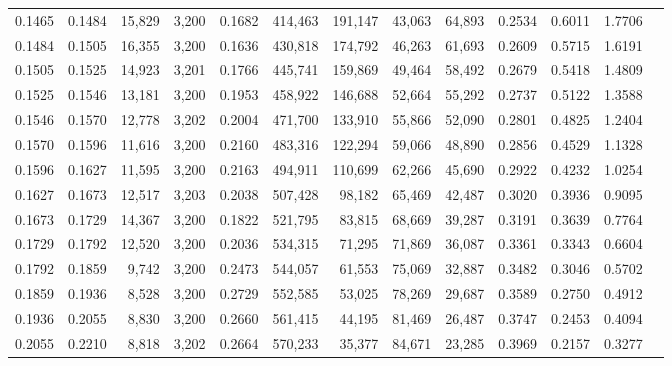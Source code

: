 \begin{tabular}{rrrrrrrrrrrrr}
0.1465 & 0.1484 & 15,829 & 3,200 &                                     0.1682 & 414,463 & 191,147 &  43,063 &  64,893 & 0.2534 & 0.6011 & 1.7706 \\
0.1484 & 0.1505 & 16,355 & 3,200 &                                     0.1636 & 430,818 & 174,792 &  46,263 &  61,693 & 0.2609 & 0.5715 & 1.6191 \\
0.1505 & 0.1525 & 14,923 & 3,201 &                                     0.1766 & 445,741 & 159,869 &  49,464 &  58,492 & 0.2679 & 0.5418 & 1.4809 \\
0.1525 & 0.1546 & 13,181 & 3,200 &                                     0.1953 & 458,922 & 146,688 &  52,664 &  55,292 & 0.2737 & 0.5122 & 1.3588 \\
0.1546 & 0.1570 & 12,778 & 3,202 &                                     0.2004 & 471,700 & 133,910 &  55,866 &  52,090 & 0.2801 & 0.4825 & 1.2404 \\
0.1570 & 0.1596 & 11,616 & 3,200 &                                     0.2160 & 483,316 & 122,294 &  59,066 &  48,890 & 0.2856 & 0.4529 & 1.1328 \\
0.1596 & 0.1627 & 11,595 & 3,200 &                                     0.2163 & 494,911 & 110,699 &  62,266 &  45,690 & 0.2922 & 0.4232 & 1.0254 \\
0.1627 & 0.1673 & 12,517 & 3,203 &                                     0.2038 & 507,428 &  98,182 &  65,469 &  42,487 & 0.3020 & 0.3936 & 0.9095 \\
0.1673 & 0.1729 & 14,367 & 3,200 &                                     0.1822 & 521,795 &  83,815 &  68,669 &  39,287 & 0.3191 & 0.3639 & 0.7764 \\
0.1729 & 0.1792 & 12,520 & 3,200 &                                     0.2036 & 534,315 &  71,295 &  71,869 &  36,087 & 0.3361 & 0.3343 & 0.6604 \\
0.1792 & 0.1859 &  9,742 & 3,200 &                                     0.2473 & 544,057 &  61,553 &  75,069 &  32,887 & 0.3482 & 0.3046 & 0.5702 \\
0.1859 & 0.1936 &  8,528 & 3,200 &                                     0.2729 & 552,585 &  53,025 &  78,269 &  29,687 & 0.3589 & 0.2750 & 0.4912 \\
0.1936 & 0.2055 &  8,830 & 3,200 &                                     0.2660 & 561,415 &  44,195 &  81,469 &  26,487 & 0.3747 & 0.2453 & 0.4094 \\
0.2055 & 0.2210 &  8,818 & 3,202 &                                     0.2664 & 570,233 &  35,377 &  84,671 &  23,285 & 0.3969 & 0.2157 & 0.3277 \\

\end{tabular}
